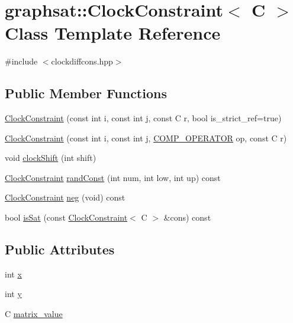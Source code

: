 \hypertarget{classgraphsat_1_1_clock_constraint}{}\section{graphsat\+::Clock\+Constraint$<$ C $>$ Class Template Reference}
\label{classgraphsat_1_1_clock_constraint}


{\ttfamily \#include $<$clockdiffcons.\+hpp$>$}

\subsection*{Public Member Functions}
\begin{DoxyCompactItemize}
\item 
\mbox{\hyperlink{classgraphsat_1_1_clock_constraint_acb93892181e50c6bbbe2a67faaf27242}{Clock\+Constraint}} (const int i, const int j, const C r, bool is\+\_\+strict\+\_\+ref=true)
\item 
\mbox{\hyperlink{classgraphsat_1_1_clock_constraint_a81ba549abd62032b7491ff03190d31e0}{Clock\+Constraint}} (const int i, const int j, \mbox{\hyperlink{namespacegraphsat_acfb5939f9bdafbd9aea0d084b9a56f69}{C\+O\+M\+P\+\_\+\+O\+P\+E\+R\+A\+T\+OR}} op, const C r)
\item 
void \mbox{\hyperlink{classgraphsat_1_1_clock_constraint_a609e8b8b9805a2934da918fbf8311ddc}{clock\+Shift}} (int shift)
\item 
\mbox{\hyperlink{classgraphsat_1_1_clock_constraint}{Clock\+Constraint}} \mbox{\hyperlink{classgraphsat_1_1_clock_constraint_a25326d99afbcc8355cfbc290ba81af8b}{rand\+Const}} (int num, int low, int up) const
\item 
\mbox{\hyperlink{classgraphsat_1_1_clock_constraint}{Clock\+Constraint}} \mbox{\hyperlink{classgraphsat_1_1_clock_constraint_a561831532370518c82b43f6e8a3a5c9e}{neg}} (void) const
\item 
bool \mbox{\hyperlink{classgraphsat_1_1_clock_constraint_aa4beb1eb7911ff6c503e4008ae3718ab}{is\+Sat}} (const \mbox{\hyperlink{classgraphsat_1_1_clock_constraint}{Clock\+Constraint}}$<$ C $>$ \&cons) const
\end{DoxyCompactItemize}
\subsection*{Public Attributes}
\begin{DoxyCompactItemize}
\item 
int \mbox{\hyperlink{classgraphsat_1_1_clock_constraint_a5dd6153cbc0791becfd1e34f96995d57}{x}}
\item 
int \mbox{\hyperlink{classgraphsat_1_1_clock_constraint_aa3113fd47bd0291152a30708edd2acf5}{y}}
\item 
C \mbox{\hyperlink{classgraphsat_1_1_clock_constraint_aca6f542f04311f892b4662bc0b86d689}{matrix\+\_\+value}}
\end{DoxyCompactItemize}
